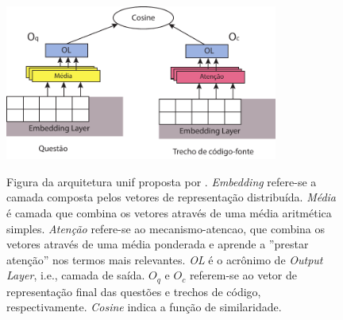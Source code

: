 \begin{figure}[h]
    \centering
    \caption[Figura da arquitetura \Gls{unif} proposta por .]{Figura da arquitetura \Gls{unif} proposta por . \emph{Embedding} refere-se a camada composta pelos vetores de representação distribuída. \emph{Média} é camada que combina os vetores através de uma média aritmética simples. \emph{Atenção} refere-se ao \gls{mecanismo-atencao}, que combina os vetores através de uma média ponderada e aprende a ''prestar atenção'' nos termos mais relevantes. \emph{OL} é o acrônimo de \emph{Output Layer}, i.e., camada de saída. $O_{q}$ e $O_{c}$ referem-se ao vetor de representação final das questões e trechos de código, respectivamente. \emph{Cosine} indica a função de similaridade. }
    \includegraphics[width=0.8\textwidth]{figuras/cap-experimento/unif-architecture.pdf}
    \label{fig:unif-architecture}
\end{figure}

